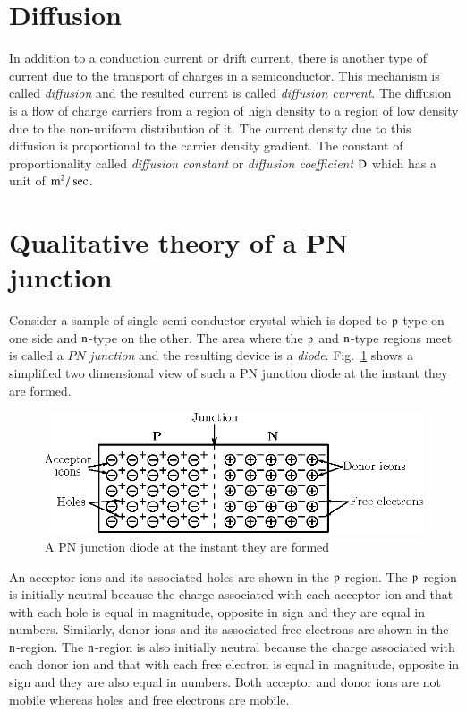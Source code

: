 \section{Diffusion}\label{sec1.4}

In addition to a conduction current or drift current, there is another type of current due to the transport of charges in a semiconductor. This mechanism is called {\em diffusion} and the resulted current is called {\em diffusion current}. The diffusion is a flow of charge carriers from a region of high density to a region of low density due to the non-uniform distribution of it. The current density due to this diffusion is proportional to the carrier density gradient. The constant of proportionality called {\em diffusion constant} or {\em diffusion coefficient} $\textrm{D}$ which has a unit of $\textrm{m}^{2}/\sec$. 

\section{Qualitative theory of a PN junction}\label{sec1.5}

Consider a sample of single semi-conductor crystal which is doped to $\textrm{p}$-type on one side and $\textrm{n}$-type on the other. The area where the $\textrm{p}$ and $\textrm{n}$-type regions meet is called a $PN$ {\em junction} and the resulting device is a {\em diode}. Fig.~\ref{fig1.15} shows a simplified two dimensional view of such a PN junction diode at the instant they are formed.
\begin{figure}[H]
\centering
\includegraphics{chap1/fig1.15.eps}
\caption{A PN junction diode at the instant they are formed}\label{fig1.15}
\end{figure}

An acceptor ions and its associated holes are shown in the $\textrm{p}$-region. The $\textrm{p}$-region is initially neutral because the charge associated with each acceptor ion and that with each hole is equal in magnitude, opposite in sign and they are equal in numbers. Similarly, donor ions and its associated free electrons are shown in the $\textrm{n}$-region. The $\textrm{n}$-region is also initially neutral because the charge associated with each donor ion and that with each free electron is equal in magnitude, opposite in sign and they are also equal in numbers. Both acceptor and donor ions are not mobile whereas holes and free electrons are mobile.

